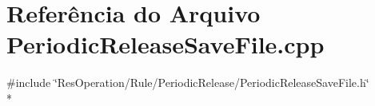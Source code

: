 \section{Referência do Arquivo Periodic\+Release\+Save\+File.\+cpp}
\label{_rule_2_periodic_release_2_periodic_release_save_file_8cpp}
{\ttfamily \#include \char`\"{}Res\+Operation/\+Rule/\+Periodic\+Release/\+Periodic\+Release\+Save\+File.\+h\char`\"{}}\\*
